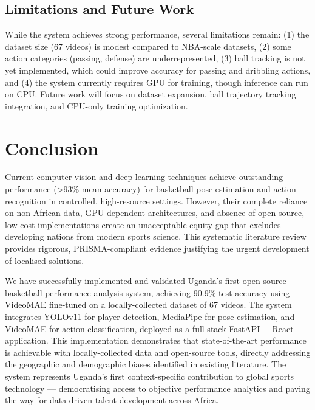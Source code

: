 \documentclass[conference]{IEEEtran}
\begin{document}
\subsection{Limitations and Future Work}
While the system achieves strong performance, several limitations remain: (1) the dataset size (67 videos) is modest compared to NBA-scale datasets, (2) some action categories (passing, defense) are underrepresented, (3) ball tracking is not yet implemented, which could improve accuracy for passing and dribbling actions, and (4) the system currently requires GPU for training, though inference can run on CPU. Future work will focus on dataset expansion, ball trajectory tracking integration, and CPU-only training optimization.

\section{Conclusion}
Current computer vision and deep learning techniques achieve outstanding performance (>93\% mean accuracy) for basketball pose estimation and action recognition in controlled, high-resource settings. However, their complete reliance on non-African data, GPU-dependent architectures, and absence of open-source, low-cost implementations create an unacceptable equity gap that excludes developing nations from modern sports science. This systematic literature review provides rigorous, PRISMA-compliant evidence justifying the urgent development of localised solutions. 

We have successfully implemented and validated Uganda's first open-source basketball performance analysis system, achieving 90.9\% test accuracy using VideoMAE fine-tuned on a locally-collected dataset of 67 videos. The system integrates YOLOv11 for player detection, MediaPipe for pose estimation, and VideoMAE for action classification, deployed as a full-stack FastAPI + React application. This implementation demonstrates that state-of-the-art performance is achievable with locally-collected data and open-source tools, directly addressing the geographic and demographic biases identified in existing literature. The system represents Uganda's first context-specific contribution to global sports technology — democratising access to objective performance analytics and paving the way for data-driven talent development across Africa.


\balance

\clearpage

\appendices





\end{document}
